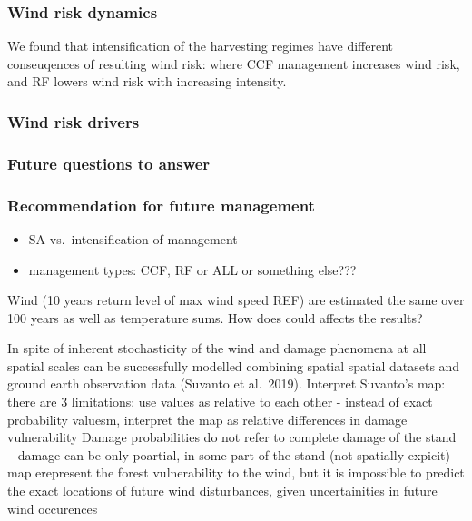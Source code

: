 \documentclass[]{elsarticle} %
\providecommand{\tightlist}{%
  \setlength{\itemsep}{0pt}\setlength{\parskip}{0pt}}
\begin{document}
\hypertarget{wind-risk-dynamics}{%
\subsubsection{Wind risk dynamics}\label{wind-risk-dynamics}}

We found that intensification of the harvesting regimes have different conseuqences of resulting wind risk: where CCF management increases wind risk, and RF lowers wind risk with increasing intensity.

\hypertarget{wind-risk-drivers}{%
\subsubsection{Wind risk drivers}\label{wind-risk-drivers}}

\hypertarget{future-questions-to-answer}{%
\subsubsection{Future questions to answer}\label{future-questions-to-answer}}

\hypertarget{recommendation-for-future-management}{%
\subsubsection{Recommendation for future management}\label{recommendation-for-future-management}}

\begin{itemize}
\tightlist
\item
  SA vs.~intensification of management
\item
  management types: CCF, RF or ALL or something else???
\end{itemize}

Wind (10 years return level of max wind speed REF) are estimated the same over 100 years as well as temperature sums. How does could affects the results?

In spite of inherent stochasticity of the wind and damage phenomena at all spatial scales can be successfully modelled combining spatial spatial datasets and ground earth observation data (Suvanto et al.~2019).
Interpret Suvanto's map: there are 3 limitations:
use values as relative to each other - instead of exact probability valuesm, interpret the map as relative differences in damage vulnerability
Damage probabilities do not refer to complete damage of the stand -- damage can be only poartial, in some part of the stand (not spatially expicit)
map erepresent the forest vulnerability to the wind, but it is impossible to predict the exact locations of future wind disturbances, given uncertainities in future wind occurences
\end{document}
